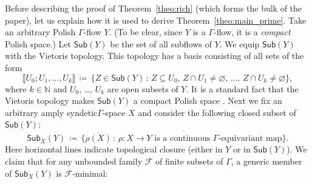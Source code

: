 \documentclass[11pt,reqno,psamsfonts]{amsart}
\theoremstyle{bfnote}
\theoremstyle{definition}
\theoremstyle{remark}
\newcommand{\0}{\varnothing}
\newcommand{\set}[1]{\{#1\}}
\newcommand{\defeq}{\coloneqq}
\newcommand{\bemph}[1]{{\normalfont#1}}
\newcommand{\ep}[1]{\bemph{(}#1\bemph{)}}
\newcommand{\red}[1]{{\color{red}#1}}
\newcommand{\todo}[1]{\red{\textbf{\upshape{[#1]}}}}
\newcommand{\emphd}[1]{{\fontseries{b}\selectfont\textsf{#1}}}
\newcommand{\G}{\Gamma}
\newcommand{\N}{\mathbb{N}}
\newcommand{\Sub}{\mathsf{Sub}}
\newcommand{\sr}{amply syndetic\xspace}
\numberwithin{equation}{section}
\begin{document}
    Before describing the proof of Theorem~\ref{theo:rich} (which forms the bulk of the paper), let us explain how it is used to derive Theorem~\ref{theo:main_prime}. 
    Take an arbitrary Polish $\G$-flow $Y$. (To be clear, since $Y$ is a $\G$-flow, it is a \emph{compact} Polish space.) Let $\Sub(Y)$ be the set of all subflows of $Y$. %
    We equip $\Sub(Y)$ with the \emphd{Vietoris topology}. This topology has a basis consisting of all sets of the form \label{page:Vietoris}
    \[
        \llbracket U_0; U_1, \ldots, U_k\rrbracket \,\defeq\, \set{Z \in \Sub(Y) \,:\, Z \subseteq U_0, \, Z \cap U_1 \neq \0, \, \ldots, \, Z \cap U_k \neq \0},
    \]
    where $k \in \N$ and $U_0$, \ldots, $U_k$ are open subsets of $Y$. It is a standard fact that the Vietoris topology makes $\Sub(Y)$ a compact Polish space \cite[\S4.F]{KechrisDST}. %
    Next we fix an arbitrary \sr $\G$-space $X$ and consider the following closed subset of $\Sub(Y)$:
    \[
        \Sub_X(Y) \,\defeq\, \overline{\big\{\overline{\rho(X)} \,:\, \text{$\rho \colon X \to Y$ is a continuous $\G$-equivariant map}\big\}}.
    \]
    Here horizontal lines indicate topological closure (either in $Y$ or in $\Sub(Y)$). %
    We claim that for any unbounded family $\mathcal{F}$ of finite subsets of $\G$, %
    a generic member of $\Sub_X(Y)$ is $\mathcal{F}$-minimal:
\end{document}
